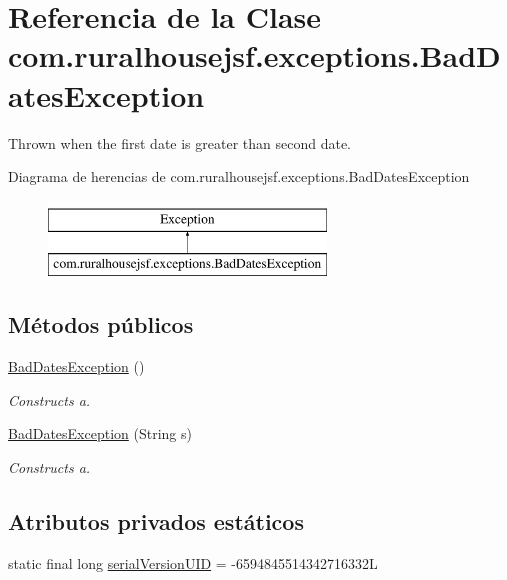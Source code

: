 \hypertarget{classcom_1_1ruralhousejsf_1_1exceptions_1_1_bad_dates_exception}{}\section{Referencia de la Clase com.\+ruralhousejsf.\+exceptions.\+Bad\+Dates\+Exception}
\label{classcom_1_1ruralhousejsf_1_1exceptions_1_1_bad_dates_exception}


Thrown when the first date is greater than second date.  


Diagrama de herencias de com.\+ruralhousejsf.\+exceptions.\+Bad\+Dates\+Exception\begin{figure}[H]
\begin{center}
\leavevmode
\includegraphics[height=2.000000cm]{da/de2/classcom_1_1ruralhousejsf_1_1exceptions_1_1_bad_dates_exception}
\end{center}
\end{figure}
\subsection*{Métodos públicos}
\begin{DoxyCompactItemize}
\item 
\mbox{\hyperlink{classcom_1_1ruralhousejsf_1_1exceptions_1_1_bad_dates_exception_a0e519d0653a6b74703c8d586c3dca1bc}{Bad\+Dates\+Exception}} ()
\begin{DoxyCompactList}\small\item\em Constructs a. \end{DoxyCompactList}\item 
\mbox{\hyperlink{classcom_1_1ruralhousejsf_1_1exceptions_1_1_bad_dates_exception_ace7222589b4c31c6b4a3d44d952c512a}{Bad\+Dates\+Exception}} (String s)
\begin{DoxyCompactList}\small\item\em Constructs a. \end{DoxyCompactList}\end{DoxyCompactItemize}
\subsection*{Atributos privados estáticos}
\begin{DoxyCompactItemize}
\item 
static final long \mbox{\hyperlink{classcom_1_1ruralhousejsf_1_1exceptions_1_1_bad_dates_exception_a455e5569f117b53852ac14206bb2177f}{serial\+Version\+U\+ID}} = -\/6594845514342716332L
\end{DoxyCompactItemize}


